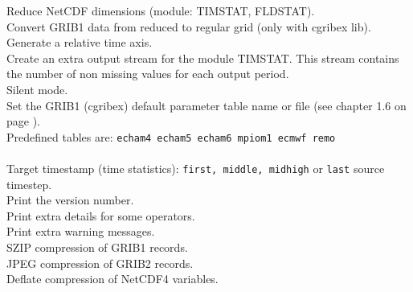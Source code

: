\begin{tabbing}
         \> Reduce NetCDF dimensions (module: TIMSTAT, FLDSTAT). \\
         \> Convert GRIB1 data from reduced to regular grid (only with cgribex lib). \\
         \> Generate a relative time axis. \\
         \> Create an extra output stream for the module TIMSTAT. This stream contains  \\
         \> the number of non missing values for each output period. \\
         \> Silent mode. \\
         \> Set the GRIB1 (cgribex) default parameter table name or file (see chapter 1.6 on page \pageref{PARAMETER_TABLE}).\\
         \> Predefined tables are:  {\tt echam4 echam5 echam6 mpiom1 ecmwf remo}\\
         \> \\
\makebox[1.5in][l]{\hspace*{1cm}}
         \> Target timestamp (time statistics): {\tt first, middle, midhigh} or {\tt last} source timestep. \\
         \> Print the version number. \\
         \> Print extra details for some operators. \\
         \> Print extra warning messages. \\
         \> SZIP compression of GRIB1 records. \\
         \> JPEG compression of GRIB2 records. \\
         \> Deflate compression of NetCDF4 variables. \\
\end{tabbing}

